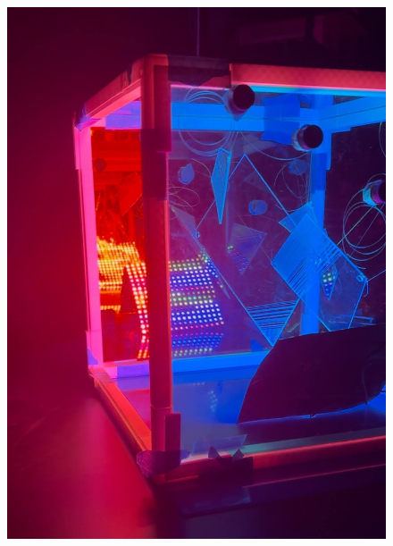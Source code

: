 \documentclass{article}
\begin{document}
\begin{figure}[h]
    \centering
  \begin{minipage}[b]{0.35\textwidth}
    \includegraphics[width=\textwidth]{images/unnamed12.jpg}
  \end{minipage}
  \hfill
  \begin{minipage}[b]{0.35\textwidth}

\end{minipage}
\end{figure}
\end{document}

